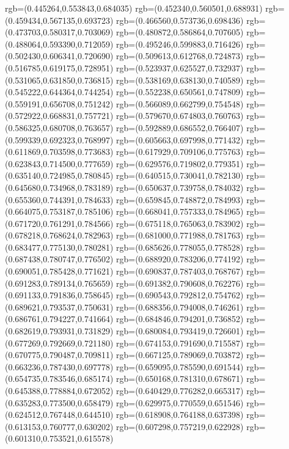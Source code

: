 {{{			rgb=(0.445264,0.553843,0.684035)
			rgb=(0.452340,0.560501,0.688931)
			rgb=(0.459434,0.567135,0.693723)
			rgb=(0.466560,0.573736,0.698436)
			rgb=(0.473703,0.580317,0.703069)
			rgb=(0.480872,0.586864,0.707605)
			rgb=(0.488064,0.593390,0.712059)
			rgb=(0.495246,0.599883,0.716426)
			rgb=(0.502430,0.606341,0.720690)
			rgb=(0.509613,0.612768,0.724873)
			rgb=(0.516785,0.619175,0.728951)
			rgb=(0.523937,0.625527,0.732937)
			rgb=(0.531065,0.631850,0.736815)
			rgb=(0.538169,0.638130,0.740589)
			rgb=(0.545222,0.644364,0.744254)
			rgb=(0.552238,0.650561,0.747809)
			rgb=(0.559191,0.656708,0.751242)
			rgb=(0.566089,0.662799,0.754548)
			rgb=(0.572922,0.668831,0.757721)
			rgb=(0.579670,0.674803,0.760763)
			rgb=(0.586325,0.680708,0.763657)
			rgb=(0.592889,0.686552,0.766407)
			rgb=(0.599339,0.692323,0.768997)
			rgb=(0.605663,0.697998,0.771432)
			rgb=(0.611869,0.703598,0.773683)
			rgb=(0.617929,0.709106,0.775763)
			rgb=(0.623843,0.714500,0.777659)
			rgb=(0.629576,0.719802,0.779351)
			rgb=(0.635140,0.724985,0.780845)
			rgb=(0.640515,0.730041,0.782130)
			rgb=(0.645680,0.734968,0.783189)
			rgb=(0.650637,0.739758,0.784032)
			rgb=(0.655360,0.744391,0.784633)
			rgb=(0.659845,0.748872,0.784993)
			rgb=(0.664075,0.753187,0.785106)
			rgb=(0.668041,0.757333,0.784965)
			rgb=(0.671720,0.761291,0.784566)
			rgb=(0.675118,0.765063,0.783902)
			rgb=(0.678218,0.768624,0.782963)
			rgb=(0.681000,0.771988,0.781763)
			rgb=(0.683477,0.775130,0.780281)
			rgb=(0.685626,0.778055,0.778528)
			rgb=(0.687438,0.780747,0.776502)
			rgb=(0.688920,0.783206,0.774192)
			rgb=(0.690051,0.785428,0.771621)
			rgb=(0.690837,0.787403,0.768767)
			rgb=(0.691283,0.789134,0.765659)
			rgb=(0.691382,0.790608,0.762276)
			rgb=(0.691133,0.791836,0.758645)
			rgb=(0.690543,0.792812,0.754762)
			rgb=(0.689621,0.793537,0.750631)
			rgb=(0.688356,0.794008,0.746261)
			rgb=(0.686761,0.794227,0.741664)
			rgb=(0.684846,0.794201,0.736852)
			rgb=(0.682619,0.793931,0.731829)
			rgb=(0.680084,0.793419,0.726601)
			rgb=(0.677269,0.792669,0.721180)
			rgb=(0.674153,0.791690,0.715587)
			rgb=(0.670775,0.790487,0.709811)
			rgb=(0.667125,0.789069,0.703872)
			rgb=(0.663236,0.787430,0.697778)
			rgb=(0.659095,0.785590,0.691544)
			rgb=(0.654735,0.783546,0.685174)
			rgb=(0.650168,0.781310,0.678671)
			rgb=(0.645388,0.778884,0.672052)
			rgb=(0.640429,0.776282,0.665317)
			rgb=(0.635283,0.773500,0.658479)
			rgb=(0.629975,0.770559,0.651546)
			rgb=(0.624512,0.767448,0.644510)
			rgb=(0.618908,0.764188,0.637398)
			rgb=(0.613153,0.760777,0.630202)
			rgb=(0.607298,0.757219,0.622928)
			rgb=(0.601310,0.753521,0.615578)
}}}
